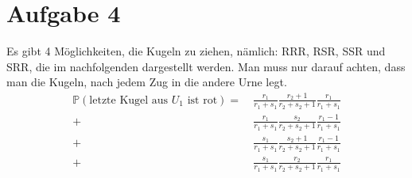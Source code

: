 \documentclass[10pt,a4paper,parskip=half]{scrartcl}
\begin{document}
\section*{Aufgabe 4}
Es gibt 4 Möglichkeiten, die Kugeln zu ziehen, nämlich: RRR, RSR, SSR und SRR, die im nachfolgenden dargestellt werden. Man muss nur darauf achten, dass man die Kugeln, nach jedem Zug in die andere Urne legt.
\begin{align*} 
\mathbb P(\text{letzte Kugel aus $U_1$ ist rot}) =&~ \frac{r_1}{r_1+s_1}\frac{r_2 + 1}{r_2+s_2 + 1}\frac{r_1}{r_1+s_1}\\
+&~ \frac{r_1}{r_1+s_1}\frac{s_2}{r_2+s_2 + 1}\frac{r_1-1}{r_1+s_1}\\
+&~ \frac{s_1}{r_1+s_1}\frac{s_2+1}{r_2+s_2 + 1}\frac{r_1-1}{r_1+s_1}\\
+&~ \frac{s_1}{r_1+s_1}\frac{r_2}{r_2+s_2 + 1}\frac{r_1}{r_1+s_1}
\end{align*}
\end{document}
